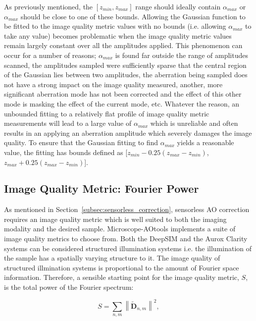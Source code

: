 As previously mentioned, the $[z_{min},z_{max}]$ range should ideally
contain $\alpha_{max}$ or $\alpha_{max}$ should be close to one of these
bounds. Allowing the Gaussian function to be fitted to the image
quality metric values with no bounds (i.e. allowing $\alpha_{max}$ to take
any value) becomes problematic when the image quality metric values
remain largely constant over all the amplitudes applied. This
phenomenon can occur for a number of reasons; $\alpha_{max}$ is found far
outside the range of amplitudes scanned, the amplitudes sampled were
sufficiently sparse that the central region of the Gaussian lies
between two amplitudes, the aberration being sampled does not have a
strong impact on the image quality measured, another, more significant
aberration mode has not been corrected and the effect of this other
mode is masking the effect of the current mode, etc. Whatever the
reason, an unbounded fitting to a relatively flat profile of image
quality metric measurements will lead to a large value of $\alpha_{max}$
which is unreliable and often results in an applying an aberration
amplitude which severely damages the image quality. To ensure that the
Gaussian fitting to find $\alpha_{max}$ yields a reasonable value, the
fitting has bounds defined as [$z_{min} - 0.25(z_{max}-z_{min})$, $z_{max} + 0.25(z_{max}-z_{min})$].

\subsection{Image Quality Metric: Fourier Power}
\label{subsec:fourier_power_metric}


As mentioned in Section~\ref{subsec:sensorless_correction}, sensorless AO 
correction requires an image quality metric which is well suited to both the 
imaging modality and the desired sample. Microscope-AOtools implements a 
suite of image quality metrics to choose from. Both the DeepSIM and the Aurox 
Clarity systems can be considered structured illumination systems i.e. the illumination of the sample has a spatially varying structure to it.  
The image quality of structured illmination systems is proportional to the amount of Fourier space information. Therefore, a sensible starting point for the image quality metric, $S$, is 
the total power of the Fourier spectrum:

\begin{equation}\label{eq:fourier_power_spectrum}
S = \sum\limits_{n,m}{\left\| \tilde{\textbf{D}}_{n,m} \right\|^2},
\end{equation}


